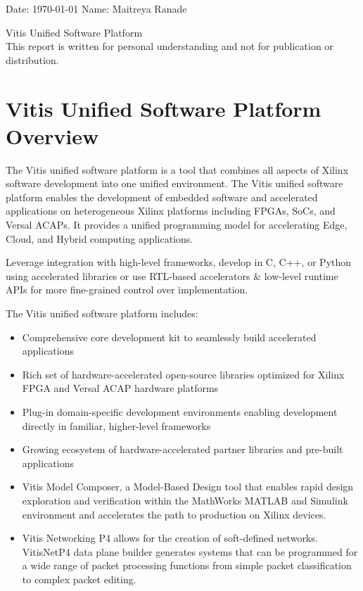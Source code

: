 \documentclass{report}
\begin{document}
	\onehalfspacing
	Date: \today{} \hfill{} Name: Maitreya Ranade
	\begin{center}
		\vspace*{\fill}
		{\LARGE Vitis Unified Software Platform} \\
		This report is written for personal understanding and not for publication or distribution.
		\vspace*{\fill}
	\end{center}
	
	\pagebreak
	\singlespacing
	\tableofcontents
	\pagebreak  

	\chapter{Vitis Unified Software Platform Overview} 
	The Vitis unified software platform is a tool that combines all aspects of Xilinx software development into one unified environment. The Vitis unified software platform enables the development of embedded software and accelerated applications on heterogeneous Xilinx platforms including FPGAs, SoCs, and Versal ACAPs. It provides a unified programming model for accelerating Edge, Cloud, and Hybrid computing applications. 
	
	\par Leverage integration with high-level frameworks, develop in C, C++, or Python using accelerated libraries or use RTL-based accelerators \& low-level runtime APIs for more fine-grained control over implementation.

	The Vitis unified software platform includes:
	\begin{itemize}
		\item Comprehensive core development kit to seamlessly build accelerated applications
		\item Rich set of hardware-accelerated open-source libraries optimized for Xilinx FPGA and Versal ACAP hardware platforms
		\item Plug-in domain-specific development environments enabling development directly in familiar, higher-level frameworks
		\item Growing ecosystem of hardware-accelerated partner libraries and pre-built applications
		\item Vitis Model Composer, a Model-Based Design tool that enables rapid design exploration and verification within the MathWorks MATLAB and Simulink environment and accelerates the path to production on Xilinx devices. 
		\item Vitis Networking P4 allows for the creation of soft-defined networks. VitisNetP4 data plane builder generates systems that can be programmed for a wide range of packet processing functions from simple packet classification to complex packet editing.
	\end{itemize}
\end{document}
